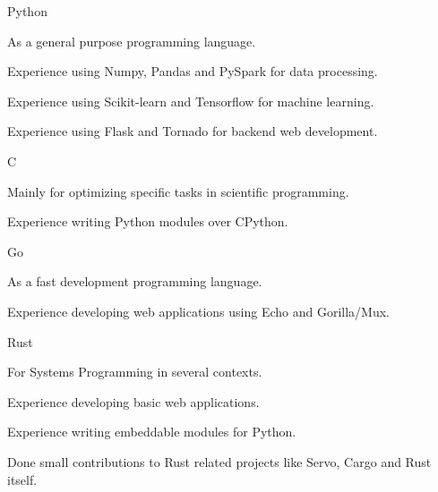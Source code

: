 


\begin{cvskills}


\cvskill
{Python} %
{
  \begin{cvitems}
  \item {As a general purpose programming language.}
  \item {Experience using Numpy, Pandas and PySpark for data processing.}
  \item {Experience using Scikit-learn and Tensorflow for machine learning.}
  \item {Experience using Flask and Tornado for backend web development.}
  \end{cvitems}
}


\cvskill
{C} %
{
  \begin{cvitems}
  \item {Mainly for optimizing specific tasks in scientific programming.}
  \item {Experience writing Python modules over CPython.}
  \end{cvitems}
}


\cvskill
{Go} %
{
  \begin{cvitems}
  \item {As a fast development programming language.}
  \item {Experience developing web applications using Echo and Gorilla/Mux.} 
  \end{cvitems}
}


\cvskill
{Rust} %
{
  \begin{cvitems}
  \item {For Systems Programming in several contexts.}
  \item {Experience developing basic web applications.}
  \item {Experience writing embeddable modules for Python.}
  \item {Done small contributions to Rust related projects like Servo, Cargo and Rust itself.}
  \end{cvitems}
}


\end{cvskills}
